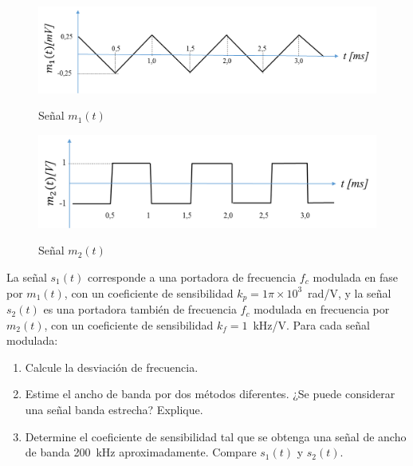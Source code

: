 \begin{enumerate}
\begin{figure}[h!]
	\captionsetup{justification = raggedright, singlelinecheck = false}
	\caption{Señal $m_1(t)$} 
	\centering
	\includegraphics[scale=0.7]{Imagenes/2015-1.png}
	\label{fig:2015-1}
\end{figure}

\begin{figure}[h!]
	\captionsetup{justification = raggedright, singlelinecheck = false}
	\caption{Señal $m_2(t)$} 
	\centering
	\includegraphics[scale=0.7]{Imagenes/2015-2.png}
	\label{fig:2015-2}
\end{figure}
La señal $s_1(t)$ corresponde a una portadora de frecuencia $f_c$ modulada en fase por $m_1(t)$, con un coeficiente de sensibilidad $k_p=1\pi\times 10^3$~rad/V, y la señal $s_2(t)$ es una portadora también de frecuencia $f_c$ modulada en frecuencia por $m_2(t)$, con un coeficiente de sensibilidad $k_f=1$~kHz/V. Para cada señal modulada:
\begin{enumerate}
	\item Calcule la desviación de frecuencia.
	\item Estime el ancho de banda por dos métodos diferentes. ¿Se puede considerar una señal banda estrecha? Explique.
	\item Determine el coeficiente de sensibilidad tal que se obtenga una señal de ancho de banda 200~kHz aproximadamente. Compare $s_1(t)$ y $s_2(t)$.
\end{enumerate}


\end{enumerate}
